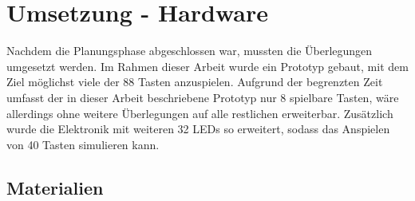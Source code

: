 
\chapter{Umsetzung - Hardware} \label{umsetzungHW}


Nachdem die Planungsphase abgeschlossen war, mussten die Überlegungen umgesetzt werden.
Im Rahmen dieser Arbeit wurde ein Prototyp gebaut, mit dem Ziel möglichst viele der 88 Tasten anzuspielen.
Aufgrund der begrenzten Zeit umfasst der in dieser Arbeit beschriebene Prototyp nur 8 spielbare Tasten,
wäre allerdings ohne weitere Überlegungen auf alle restlichen erweiterbar.
Zusätzlich wurde die Elektronik mit weiteren 32 LEDs so erweitert, sodass das Anspielen von 40 Tasten simulieren kann.


\section{Materialien}
